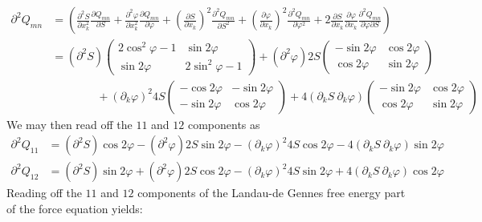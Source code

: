 \documentclass[reqno]{article}
\begin{document}
	\begin{equation}
	\begin{split}
		\partial^2 Q_{mn} &= \left( \frac{\partial^2 S}{\partial x_k^2}\frac{\partial Q_{mn}}{\partial S} + \frac{\partial^2 \varphi}{\partial x_k^2}\frac{\partial Q_{mn}}{\partial \varphi} + \left( \frac{\partial S}{\partial x_k} \right)^2 \frac{\partial^2 Q_{mn}}{\partial S^2} + \left( \frac{\partial \varphi}{\partial x_k} \right)^2 \frac{\partial^2 Q_{mn}}{\partial \varphi^2} + 2\frac{\partial S}{\partial x_k}\frac{\partial \varphi}{\partial x_k}\frac{\partial^2 Q_{mn}}{\partial \varphi \partial S} \right) \\
		&= \left(\partial^2 S\right)
		\begin{pmatrix}
			2\cos^2\varphi - 1 & \sin2\varphi \\
			\sin2\varphi & 2\sin^2\varphi - 1
		\end{pmatrix}
		+ \left(\partial^2 \varphi\right)
		2S
		\begin{pmatrix}
			-\sin2\varphi & \cos2\varphi \\
			\cos2\varphi & \sin2\varphi
		\end{pmatrix} \\
		&\qquad\qquad +
		\left(\partial_k \varphi\right)^2
		4S
		\begin{pmatrix}
			-\cos2\varphi & -\sin2\varphi \\
			-\sin2\varphi & \cos2\varphi
		\end{pmatrix}
		+ 4 \left( \partial_k S \:\partial_k \varphi \right)
		\begin{pmatrix}
			-\sin2\varphi & \cos2\varphi \\
			\cos2\varphi & \sin2\varphi
		\end{pmatrix}
	\end{split}
	\end{equation}
	We may then read off the $11$ and $12$ components as
	\begin{align}
		\partial^2 Q_{11} &= \left(\partial^2 S\right) \cos2\varphi -  \left( \partial^2\varphi \right) 2S\sin2\varphi - \left(\partial_k \varphi\right)^2 4S \cos2\varphi - 4\left( \partial_k S\: \partial_k \varphi \right) \sin2\varphi \\
		\partial^2 Q_{12} &= \left( \partial^2 S \right)\sin2\varphi + \left( \partial^2 \varphi \right) 2S\cos2\varphi - \left( \partial_k \varphi \right)^2 4S\sin2\varphi + 4\left( \partial_k S\: \partial_k \varphi \right)\cos2\varphi
	\end{align}
	Reading off the $11$ and $12$ components of the Landau-de Gennes free energy part of the force equation yields:
\end{document}

